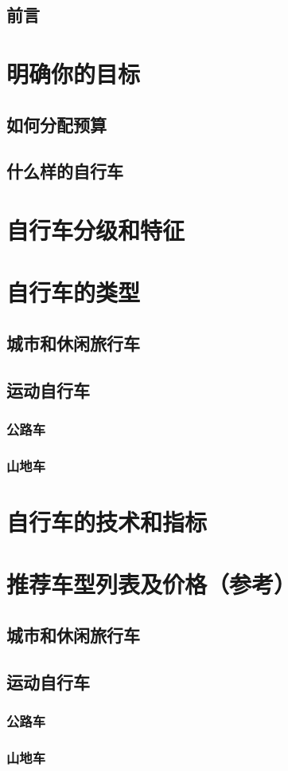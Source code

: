 \documentclass[11pt]{book}
\begin{document}
\tableofcontents
\section{前言}
\chapter{明确你的目标}
    \section{如何分配预算}
    \section{什么样的自行车}
\chapter{自行车分级和特征}
\chapter{自行车的类型}
    \section{城市和休闲旅行车}
    \section{运动自行车}
        \subsection{公路车}
        \subsection{山地车}
\chapter{自行车的技术和指标}

\appendix
\chapter{推荐车型列表及价格（参考）}
    \section{城市和休闲旅行车}
    \section{运动自行车}
        \subsection{公路车}
        \subsection{山地车}
\end{document}
